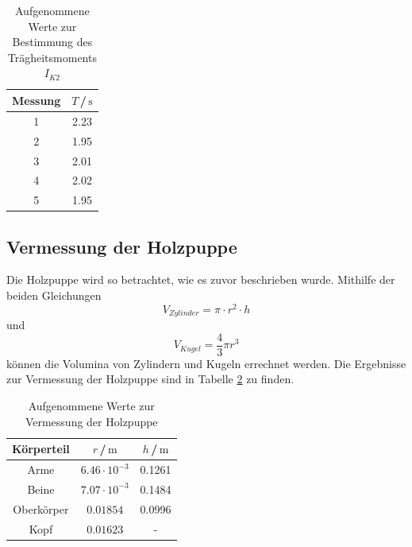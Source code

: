 \begin{table}[H]
\normalsize

\centering
{}
\begin{tabular}{c c}
\toprule
    Messung  & $T$\,/\,$\si{\second}$ \\
    \midrule

1  &   2.23   \\
2  &   1.95   \\
3  &   2.01   \\
4  &   2.02   \\
5  &   1.95   \\

    \bottomrule
\end{tabular}
\caption{Aufgenommene Werte zur Bestimmung des Trägheitsmoments $I_{K2}$}
\label{tab:aa4}
\end{table}





\subsection{Vermessung der Holzpuppe}

Die Holzpuppe wird so betrachtet, wie es zuvor beschrieben wurde. Mithilfe der beiden 
Gleichungen
\begin{equation}
    V_{Zylinder} = \pi \cdot r^2 \cdot h 
\end{equation}
\noindent
und 
\begin{equation}
    V_{Kugel} = \frac{4}{3} \pi r^3
\end{equation}
\noindent
können die Volumina von Zylindern und Kugeln errechnet werden. Die Ergebnisse zur Vermessung der
Holzpuppe sind in Tabelle \ref{tab:zz} zu finden.

\begin{table}[H]
\normalsize

\centering
{}
\begin{tabular}{c c c}
\toprule
    Körperteil &  $r$\,/\,$\si{\meter}$ & $h$\,/\,$\si{\meter}$ \\
    \midrule

Arme        &   $6.46 \cdot 10^{-3}$   &  0.1261 \\
Beine       &   $7.07 \cdot 10^{-3}$   &  0.1484 \\
Oberkörper  &   $0.01854 $    &  0.0996 \\
Kopf        &   $0.01623 $     &  -      \\

    \bottomrule
\end{tabular}
\caption{Aufgenommene Werte zur Vermessung der Holzpuppe}
\label{tab:zz}
\end{table}
\noindent

